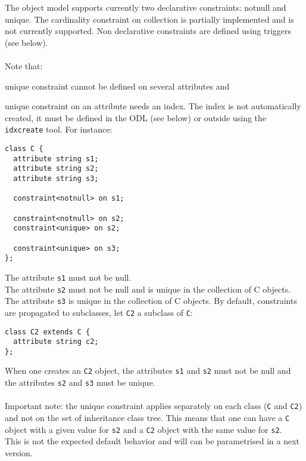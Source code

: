 The object model supports currently two declarative constraints: notnull
and unique. The cardinality constraint on collection is partially
implemented and is not currently supported.
Non declarative constraints are defined using triggers (see below).
\\
\\
Note that:
\bi
\item unique constraint cannot be defined on several attributes and
\item unique constraint on an attribute needs an index. The index is not
automatically created, it must be defined in the ODL (see below)
or outside using the \texttt{idxcreate} tool.
\ei
For instance:
\vspace{-0.2cm}
\begin{verbatim}
class C {
  attribute string s1;
  attribute string s2;
  attribute string s3;

  constraint<notnull> on s1;

  constraint<notnull> on s2;
  constraint<unique> on s2;

  constraint<unique> on s3;
};
\end{verbatim}
The attribute \texttt{s1} must not be null.\\
The attribute \texttt{s2} must not be null and is unique in the collection
of C objects.\\
The attribute \texttt{s3} is unique in the collection
of C objects.
By default, constraints are propagated to subclasses, let \texttt{C2}
a subclass of \texttt{C}:
\vspace{-0.2cm}
\begin{verbatim}
class C2 extends C {
  attribute string c2;
};
\end{verbatim}
When one creates an \texttt{C2} object, the attributes \texttt{s1} and
\texttt{s2} must not be null and the attributes \texttt{s2} and
\texttt{s3} must be unique.\\
\\
Important note: the unique constraint applies separately on each class
(\texttt{C} and \texttt{C2}) and not on the set of inheritance class tree.
This means that one can have a \texttt{C} object with a given value
for \texttt{s2} and a \texttt{C2} object with the same value for \texttt{s2}.
\\
This is not the expected default behavior and will
can be parametrised in a next version.
\\
\\
